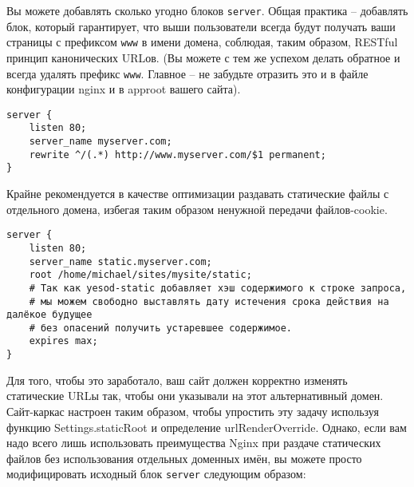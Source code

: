 Вы можете добавлять сколько угодно блоков \lstinline{server}. Общая практика -- добавлять блок, который гарантирует, что выши пользователи всегда будут получать ваши страницы с префиксом \lstinline{www} в имени домена, соблюдая, таким образом, RESTful принцип канонических URLов. (Вы можете с тем же успехом делать обратное и всегда удалять префикс \lstinline{www}. Главное -- не забудьте отразить это и в файле конфигурации nginx и в approot вашего сайта).
\begin{lstlisting}
server {
    listen 80;
    server_name myserver.com;
    rewrite ^/(.*) http://www.myserver.com/$1 permanent;
}
\end{lstlisting}
%
%

Крайне рекомендуется в качестве оптимизации раздавать статические файлы с отдельного домена, избегая таким образом ненужной передачи файлов-cookie.

%
\begin{lstlisting}
server {
    listen 80;
    server_name static.myserver.com;
    root /home/michael/sites/mysite/static;
    # Так как yesod-static добавляет хэш содержимого к строке запроса,
    # мы можем свободно выставлять дату истечения срока действия на далёкое будущее
    # без опасений получить устаревшее содержимое.
    expires max;
}
\end{lstlisting}
%

Для того, чтобы это заработало, ваш сайт должен корректно изменять статические URLы так, чтобы они указывали на этот альтернативный домен. Сайт-каркас настроен таким образом, чтобы упростить эту задачу используя функцию Settings.staticRoot и определение urlRenderOverride. Однако, если вам надо всего лишь использовать преимущества Nginx при раздаче статических файлов без использования отдельных доменных имён, вы можете просто модифицировать исходный блок \lstinline{server} следующим образом:
%
%
 
